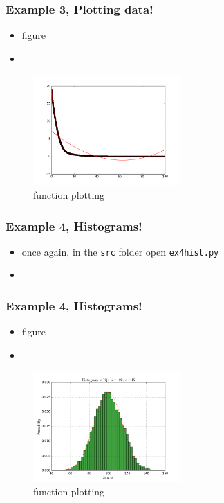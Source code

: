 \documentclass{beamer}
\begin{document}
\begin{frame}
\frametitle{Example 3, Plotting data!}
\begin{itemize}
	\item figure 
	\item
\end{itemize}
\begin{figure}
	\centering
	\includegraphics[width=0.5\textwidth]{ex3.png}
	\caption{function plotting}
	\label{fig:function}
\end{figure}
\end{frame}

\begin{frame}
\frametitle{Example 4, Histograms!}
\begin{itemize}
\item once again, in the \texttt{src} folder open \texttt{ex4hist.py}
\item
\end{itemize}
\end{frame}

\begin{frame}
\frametitle{Example 4, Histograms!}
\begin{itemize}
\item figure
\item
\end{itemize}
\begin{figure}
	\centering
	\includegraphics[width=0.5\textwidth]{ex4.png}
	\caption{function plotting}
	\label{fig:function}
\end{figure}
\end{frame}
\end{document}
